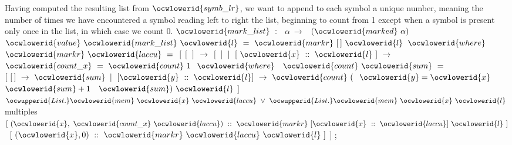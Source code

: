 \documentclass[12pt]{article}
\begin{document}
\ocwendcode{}\ocwindent{0.00em}
Having computed the resulting list from \ocwbegindcode{}$\ocwlowerid{symb\_lr}$\ocwenddcode{}, we want to append 
   to each symbol a unique number, meaning the number of times we have
   encountered a symbol reading left to right the list, beginning to count
   from 1 except when a symbol is present only once in the list, in which case 
   we count 0. 
\ocweol
\ocwindent{0.00em}
\ocwbegindcode{}$\ocwlowerid{mark\_list}~:~$~$\alpha{}~\rightarrow{}~$~$(\ocwlowerid{marked}~\alpha{})$\ocwenddcode{} 
\ocweol
\label{../ML/regular.ml:4547}%
\medskip
\ocwbegincode{}\ocwindent{0.00em}
$\ocwlowerid{value}~\ocwlowerid{mark\_list}~\ocwlowerid{l}~=~\ocwlowerid{markr}~[\,]~\ocwlowerid{l}$\ocweol
\ocwindent{1.00em}
$\ocwlowerid{where}~$~$\ocwlowerid{markr}~\ocwlowerid{laccu}~=~$\ocweol
\ocwindent{1.00em}
$[~[\,]~\rightarrow{}~[\,]$\ocweol
\ocwindent{1.00em}
$\mid{}~[~\ocwlowerid{x}~::~\ocwlowerid{l}~]~\rightarrow{}~$\ocweol
\ocwindent{2.00em}
~$\ocwlowerid{count\_x}~=~\ocwlowerid{count}~1~$\ocweol
\ocwindent{9.00em}
$\ocwlowerid{where}~$~$\ocwlowerid{count}~\ocwlowerid{sum}~=~$\ocweol
\ocwindent{11.00em}
$[~[\,]~\rightarrow{}~\ocwlowerid{sum}$\ocweol
\ocwindent{11.00em}
$\mid{}~[\ocwlowerid{y}~::~\ocwlowerid{l}]~\rightarrow{}~\ocwlowerid{count}~($~$\ocwlowerid{y}=\ocwlowerid{x}~$~$\ocwlowerid{sum}+1~$~$\ocwlowerid{sum})~\ocwlowerid{l}$\ocweol
\ocwindent{11.00em}
$]~$\ocweol
\ocwindent{2.00em}
~$\ocwupperid{List.}\ocwlowerid{mem}~\ocwlowerid{x}~\ocwlowerid{laccu}~\lor{}~\ocwupperid{List.}\ocwlowerid{mem}~\ocwlowerid{x}~\ocwlowerid{l}~$\ocwbc{} multiples \ocwec{}\ocweol
\ocwindent{2.00em}
~$[~(\ocwlowerid{x},~\ocwlowerid{count\_x}~\ocwlowerid{laccu})~::~\ocwlowerid{markr}~[\ocwlowerid{x}~::~\ocwlowerid{laccu}]~\ocwlowerid{l}~]$\ocweol
\ocwindent{2.00em}
~$[~(\ocwlowerid{x},0)~::~\ocwlowerid{markr}~\ocwlowerid{laccu}~\ocwlowerid{l}~]$\ocweol
\ocwindent{1.00em}
$]$\ocweol
\ocwindent{0.00em}
;\medskip
\end{document}

